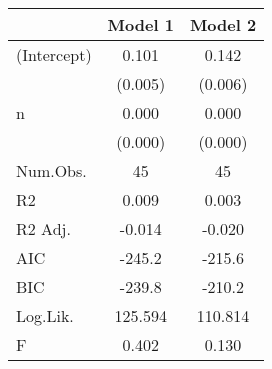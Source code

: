 \begin{table}[H]
\centering
\begin{tabular}[t]{lcc}
\toprule
  & Model 1 & Model 2\\
\midrule
(Intercept) & 0.101 & 0.142\\
 & (0.005) & (0.006)\\
n & 0.000 & 0.000\\
 & (0.000) & (0.000)\\
\midrule
Num.Obs. & 45 & 45\\
R2 & 0.009 & 0.003\\
R2 Adj. & -0.014 & -0.020\\
AIC & -245.2 & -215.6\\
BIC & -239.8 & -210.2\\
Log.Lik. & 125.594 & 110.814\\
F & 0.402 & 0.130\\
\bottomrule
\end{tabular}
\end{table}
